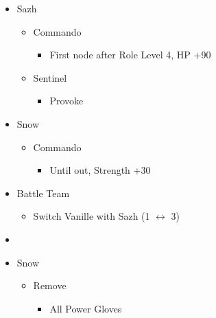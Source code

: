 \begin{multicols}{2}
\begin{menu}
\begin{itemize}
    \crystarium
    \begin{itemize}
        \item Sazh
        \begin{itemize}
            \item Commando
            \begin{itemize}
                \item First node after Role Level 4, HP +90
            \end{itemize}
            \item Sentinel
            \begin{itemize}
                \item Provoke
            \end{itemize}
        \end{itemize}
        \item Snow
        \begin{itemize}
            \item Commando
            \begin{itemize}
                \item Until out, Strength +30
            \end{itemize}
        \end{itemize}
    \end{itemize}
    \paradigm
    \begin{itemize}
        \item Battle Team
        \begin{itemize}
            \item Switch Vanille with Sazh (1 $\leftrightarrow$ 3)
        \end{itemize}
        \item {}%
{\paradigmline{\com}{\com}{\med}}%
{\paradigmline[2]{\textit{\com}}{\textit{\com}}{\textit{(\rav)}}}%
{\paradigmline{(\sen)}{\sen}{(\med)}}%
{\paradigmline{\syn}{\rav}{\rav}}%
{\paradigmline{\rav}{\rav}{\sab}}%
{\paradigmline{\rav}{\rav}{\rav}}
    \end{itemize}
    \equip
    \begin{itemize}
        \item Snow
        \begin{itemize}
            \item Remove
            \begin{itemize}
                \item All Power Gloves

\end{itemize}
\end{itemize}
\end{itemize}
\end{itemize}
\end{menu}
\end{multicols}
